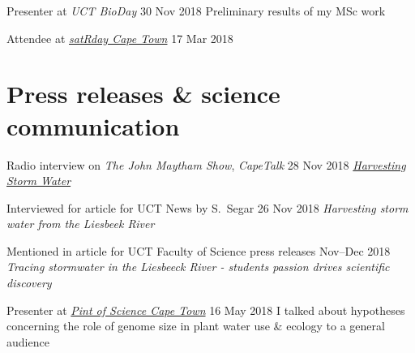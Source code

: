 \documentclass[10pt]{article}
\begin{document}
\begin{hangparas}{2em}{1}
Presenter at \textit{UCT BioDay}                       \hfill 30 Nov 2018 \break
Preliminary results of my MSc work

Attendee at \href{https://capetown2018.satrdays.org}{\textit{satRday Cape Town}}
                                                              \hfill 17 Mar 2018

\hfill

\end{hangparas}

\section*{Press releases \& science communication} %

\begin{hangparas}{2em}{1}



Radio interview on \textit{The John Maytham Show}, \textit{CapeTalk}
                                                       \hfill 28 Nov 2018 \break
\href{https://www.capetalk.co.za/articles/328900/harvesting-stormwater-from-liesbeek-river-may-aid-ct-water-supply-students-find}
{\textit{Harvesting Storm Water}}

Interviewed for article for UCT News by S.~Segar       \hfill 26 Nov 2018 \break
\textit{Harvesting storm water from the Liesbeek River}

Mentioned in article for UCT Faculty of Science press releases
                                                     \hfill Nov--Dec 2018 \break
\textit{Tracing stormwater in the Liesbeeck River - students passion drives
scientific discovery}


Presenter at \href{http://pintofsciencesa.wixsite.com/pintofsciencesa/uct-planet-earth-16}
{\textit{Pint of Science Cape Town}}                   \hfill 16 May 2018 \break
I talked about hypotheses concerning the role of genome size in plant water use 
\& ecology                                                                \break
to a general audience

\hfill

\end{hangparas}
\end{document}
